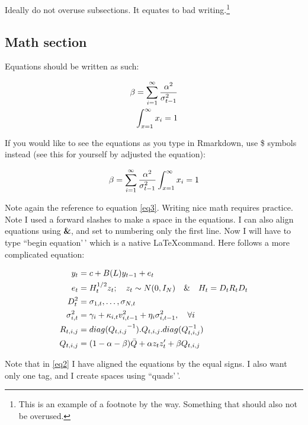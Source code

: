 \documentclass[11pt,preprint, authoryear]{elsarticle}
\numberwithin{equation}{section}
\numberwithin{figure}{section}
\numberwithin{table}{section}
\let\rmarkdownfootnote\footnote%
\def\footnote{\protect\rmarkdownfootnote}
\begin{document}
Ideally do not overuse subsections. It equates to bad
writing.\footnote{This is an example of a footnote by the way. Something
  that should also not be overused.}

\hypertarget{math-section}{%
\subsection{Math section}\label{math-section}}

Equations should be written as such:

\begin{align}
\beta = \sum_{i = 1}^{\infty}\frac{\alpha^2}{\sigma_{t-1}^2} \label{eq3} \\
\int_{x = 1}^{\infty}x_{i} = 1 \notag
\end{align}

If you would like to see the equations as you type in Rmarkdown, use \$
symbols instead (see this for yourself by adjusted the equation):

\[
\beta = \sum_{i = 1}^{\infty}\frac{\alpha^2}{\sigma_{t-1}^2} \\
\int_{x = 1}^{\infty}x_{i} = 1
\]

Note again the reference to equation \ref{eq3}. Writing nice math
requires practice. Note I used a forward slashes to make a space in the
equations. I can also align equations using \textbf{\&}, and set to
numbering only the first line. Now I will have to type ``begin
equation'\,' which is a native \LaTeX command. Here follows a more
complicated equation:

\begin{align}
    y_t &= c + B(L) y_{t-1} + e_t   \label{eq4}    \\ \notag
    e_t &= H_t^{1/2}  z_t ; \quad z_t \sim  N(0,I_N) \quad \& \quad H_t = D_tR_tD_t \\ \notag
        D_t^2 &= {\sigma_{1,t}, \dots, \sigma_{N,t}}   \\ \notag
        \sigma_{i,t}^2 &= \gamma_i+\kappa_{i,t}  v_{i, t-1}^2 +\eta_i  \sigma_{i, t-1}^2, \quad \forall i \\ \notag
        R_{t, i, j} &= {diag(Q_{t, i, j}}^{-1}) . Q_{t, i, j} . diag(Q_{t, i, j}^{-1})  \\ \notag
        Q_{t, i, j} &= (1-\alpha-\beta)  \bar{Q} + \alpha  z_t  z_t'  + \beta  Q_{t, i, j} \notag
\end{align}

Note that in \ref{eq2} I have aligned the equations by the equal signs.
I also want only one tag, and I create spaces using ``quads'\,'.
\end{document}
